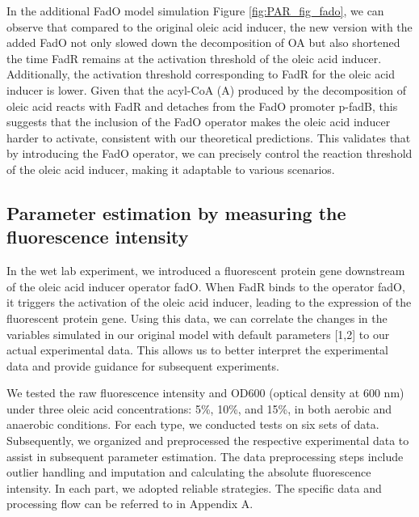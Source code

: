 \documentclass[UTF8]{article}
\begin{document}
In the additional FadO model simulation Figure \ref{fig:PAR_fig_fado}, we can observe that compared to the original oleic acid inducer, the new version with the added FadO not only slowed down the decomposition of OA but also shortened the time FadR remains at the activation threshold of the oleic acid inducer. Additionally, the activation threshold corresponding to FadR for the oleic acid inducer is lower. Given that the acyl-CoA (A) produced by the decomposition of oleic acid reacts with FadR and detaches from the FadO promoter p-fadB, this suggests that the inclusion of the FadO operator makes the oleic acid inducer harder to activate, consistent with our theoretical predictions. This validates that by introducing the FadO operator, we can precisely control the reaction threshold of the oleic acid inducer, making it adaptable to various scenarios.


\subsection{Parameter estimation by measuring the fluorescence intensity}

In the wet lab experiment, we introduced a fluorescent protein gene  downstream of the oleic acid inducer operator fadO. When FadR binds to  the operator fadO, it triggers the activation of the oleic acid inducer, leading to the expression of the fluorescent protein gene. Using this  data, we can correlate the changes in the variables simulated in our  original model with default parameters [1,2] to our actual experimental  data. This allows us to better interpret the experimental data and  provide guidance for subsequent experiments.

We tested the raw fluorescence intensity and OD600 (optical density at 600 nm) under three oleic acid concentrations: 5\%, 10\%, and 15\%, in both aerobic and anaerobic conditions. For each type, we conducted tests on six sets of data. Subsequently, we organized and preprocessed the respective experimental data to assist in subsequent parameter estimation. The data preprocessing steps include outlier handling and imputation and calculating the absolute fluorescence intensity. In each part, we adopted reliable strategies. The specific data and processing flow can be referred to in Appendix A.
\end{document}
